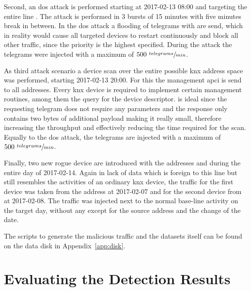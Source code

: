 Second, an \gls{dos} attack is performed starting at 2017-02-13 08:00 and targeting the entire line . The attack is performed in 3 bursts of 15 minutes with five minutes break in between. In the \gls{dos} attack a flooding of  telegrams with  are send, which in reality would cause all targeted devices to restart continuously and block all other traffic, since the  priority is the highest specified. During the attack the telegrams were injected with a maximum of \(500 \ \sfrac{telegrams}{min}\).

As third attack scenario a device scan over the entire possible \gls{knx} address space was performed, starting 2017-02-13 20:00.
For this the management \gls{apci}\break{} is send to all addresses. Every \gls{knx} device is required to implement certain management routines, among them the query for the device descriptor.  is ideal since the requesting telegram does not require any parameters and the response only contains two bytes of additional payload making it really small, therefore increasing the throughput and effectively reducing the time required for the scan. \parencite[cf.][p.~46]{DIN_EN_50090-4-1}
Equally to the \gls{dos} attack, the telegrams are injected with a maximum of \(500 \ \sfrac{telegrams}{min}\).

Finally, two new rogue device are introduced with the addresses  and  during the entire day of 2017-02-14.
Again in lack of data which is foreign to this line but still resembles the activities of an ordinary \gls{knx} device, the traffic for the first device was taken from the address  at 2017-02-07 and for the second device from  at 2017-02-08.
The traffic was injected next to the normal base-line activity on the target day, without any except for the source address and the change of the date.

The scripts to generate the malicious traffic and the datasets itself can be found on the data disk in Appendix~\ref{app:disk}.

\section{Evaluating the Detection Results}
\label{sec:methods:eval}


\begin{comment}
Angriffe:

DoS
	Kurzschluss im Bus -> DoS auf gesamtem Segment
	A_Restart-Pakete -> DoS gegen einzelne Teilnehmer
Replay-Angriffe
	Zeit mitschneiden -> wiedergeben
	Tag mitschneiden, komprimiert wiedergeben
Manipulation von Paketen (Payload tauschen)
Konfiguration manipulieren
Überwindung von Linienkopplern
Address-Spoofing
	falsche Adresse in Liniensegment
	mit existierender Adresse senden
Netzanalyse mit knxMap (https://github.com/takeshixx/knxmap)
Mitlesen und sofort gegenteilige Aktion auslösen
High-Level-Angriffe:
	nur best. Aktionen zulassen
	Provokation/Sabotage von menschl. Verhalten
Social-Engineering -> Einschleusen von Geräten
\end{comment}